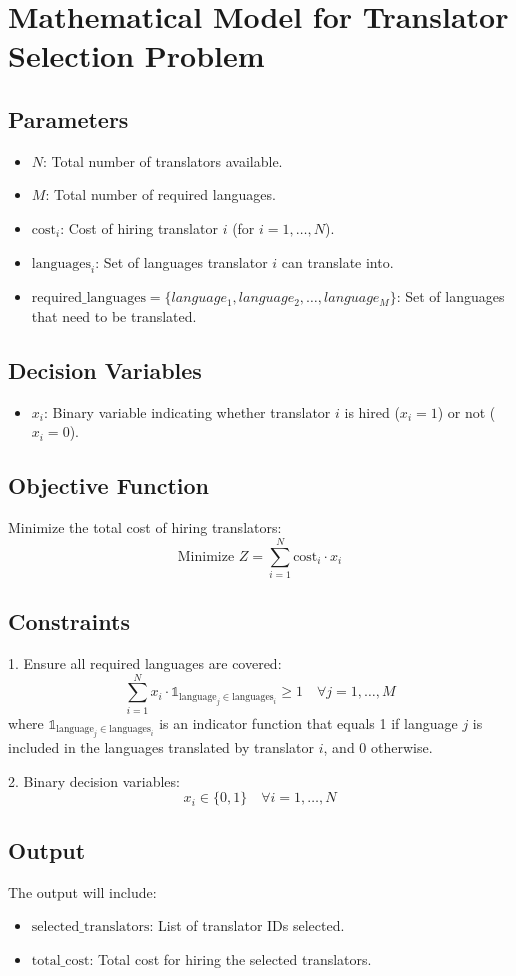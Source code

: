 \documentclass{article}
\begin{document}
\section*{Mathematical Model for Translator Selection Problem}

\subsection*{Parameters}
\begin{itemize}
    \item \( N \): Total number of translators available.
    \item \( M \): Total number of required languages.
    \item \( \text{cost}_i \): Cost of hiring translator \( i \) (for \( i = 1, \ldots, N \)).
    \item \( \text{languages}_i \): Set of languages translator \( i \) can translate into.
    \item \( \text{required\_languages} = \{language_1, language_2, \ldots, language_M\} \): Set of languages that need to be translated.
\end{itemize}

\subsection*{Decision Variables}
\begin{itemize}
    \item \( x_i \): Binary variable indicating whether translator \( i \) is hired (\( x_i = 1 \)) or not (\( x_i = 0 \)).
\end{itemize}

\subsection*{Objective Function}
Minimize the total cost of hiring translators:
\[
\text{Minimize } Z = \sum_{i=1}^{N} \text{cost}_i \cdot x_i
\]

\subsection*{Constraints}
1. Ensure all required languages are covered:
\[
\sum_{i=1}^{N} x_i \cdot \mathbb{1}_{\text{language}_j \in \text{languages}_i} \geq 1 \quad \forall j = 1, \ldots, M
\]
where \( \mathbb{1}_{\text{language}_j \in \text{languages}_i} \) is an indicator function that equals 1 if language \( j \) is included in the languages translated by translator \( i \), and 0 otherwise.

2. Binary decision variables:
\[
x_i \in \{0, 1\} \quad \forall i = 1, \ldots, N
\]

\subsection*{Output}
The output will include:
\begin{itemize}
    \item \( \text{selected\_translators} \): List of translator IDs selected.
    \item \( \text{total\_cost} \): Total cost for hiring the selected translators.
\end{itemize}
\end{document}
